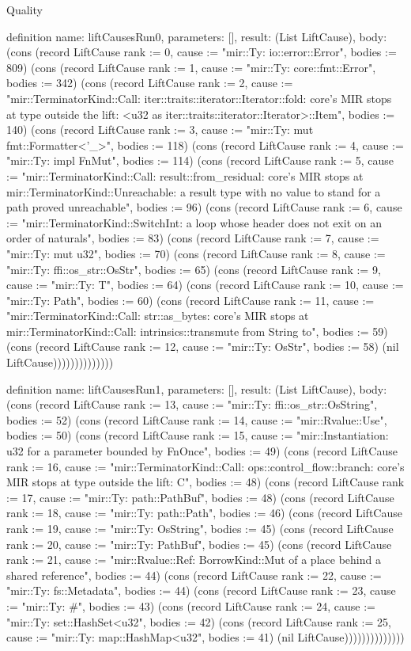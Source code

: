 \begin{lexlean}{Quality}
\begin{semanticmodule}
definition{
  name: liftCausesRun0,
  parameters: [],
  result: (List LiftCause),
  body: (cons (record LiftCause {rank := 0, cause := "mir::Ty: io::error::Error", bodies := 809}) (cons (record LiftCause {rank := 1, cause := "mir::Ty: core::fmt::Error", bodies := 342}) (cons (record LiftCause {rank := 2, cause := "mir::TerminatorKind::Call: iter::traits::iterator::Iterator::fold: core's MIR stops at type outside the lift: <u32 as iter::traits::iterator::Iterator>::Item", bodies := 140}) (cons (record LiftCause {rank := 3, cause := "mir::Ty: mut fmt::Formatter<'_>", bodies := 118}) (cons (record LiftCause {rank := 4, cause := "mir::Ty: impl FnMut", bodies := 114}) (cons (record LiftCause {rank := 5, cause := "mir::TerminatorKind::Call: result::from_residual: core's MIR stops at mir::TerminatorKind::Unreachable: a result type with no value to stand for a path proved unreachable", bodies := 96}) (cons (record LiftCause {rank := 6, cause := "mir::TerminatorKind::SwitchInt: a loop whose header does not exit on an order of naturals", bodies := 83}) (cons (record LiftCause {rank := 7, cause := "mir::Ty: mut u32", bodies := 70}) (cons (record LiftCause {rank := 8, cause := "mir::Ty: ffi::os_str::OsStr", bodies := 65}) (cons (record LiftCause {rank := 9, cause := "mir::Ty: T", bodies := 64}) (cons (record LiftCause {rank := 10, cause := "mir::Ty: Path", bodies := 60}) (cons (record LiftCause {rank := 11, cause := "mir::TerminatorKind::Call: str::as_bytes: core's MIR stops at mir::TerminatorKind::Call: intrinsics::transmute from String to", bodies := 59}) (cons (record LiftCause {rank := 12, cause := "mir::Ty: OsStr", bodies := 58}) (nil LiftCause))))))))))))))
}

definition{
  name: liftCausesRun1,
  parameters: [],
  result: (List LiftCause),
  body: (cons (record LiftCause {rank := 13, cause := "mir::Ty: ffi::os_str::OsString", bodies := 52}) (cons (record LiftCause {rank := 14, cause := "mir::Rvalue::Use", bodies := 50}) (cons (record LiftCause {rank := 15, cause := "mir::Instantiation: u32 for a parameter bounded by FnOnce", bodies := 49}) (cons (record LiftCause {rank := 16, cause := "mir::TerminatorKind::Call: ops::control_flow::branch: core's MIR stops at type outside the lift: C", bodies := 48}) (cons (record LiftCause {rank := 17, cause := "mir::Ty: path::PathBuf", bodies := 48}) (cons (record LiftCause {rank := 18, cause := "mir::Ty: path::Path", bodies := 46}) (cons (record LiftCause {rank := 19, cause := "mir::Ty: OsString", bodies := 45}) (cons (record LiftCause {rank := 20, cause := "mir::Ty: PathBuf", bodies := 45}) (cons (record LiftCause {rank := 21, cause := "mir::Rvalue::Ref: BorrowKind::Mut of a place behind a shared reference", bodies := 44}) (cons (record LiftCause {rank := 22, cause := "mir::Ty: fs::Metadata", bodies := 44}) (cons (record LiftCause {rank := 23, cause := "mir::Ty: #", bodies := 43}) (cons (record LiftCause {rank := 24, cause := "mir::Ty: set::HashSet<u32", bodies := 42}) (cons (record LiftCause {rank := 25, cause := "mir::Ty: map::HashMap<u32", bodies := 41}) (nil LiftCause))))))))))))))
}


\end{semanticmodule}
\end{lexlean}
